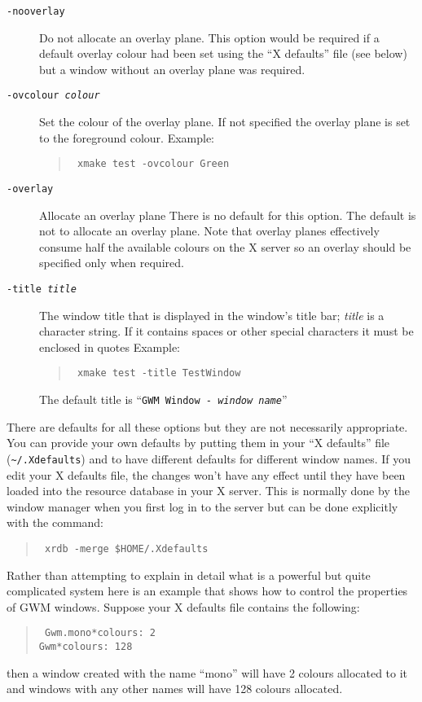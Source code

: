 \documentclass[twoside,11pt]{article}
\newcommand{\htmlref}[2]{#1}
\newcommand{\xlabel}[1]{}
\renewcommand{\_}{\texttt{\symbol{95}}}
\begin{document}
\begin{description}
\item[{\tt -nooverlay}] Do not allocate an overlay plane. This option
would be required if a default overlay colour had been set using the ``X
defaults'' file \htmlref{(see below)}{xdefaults} but a window without an
overlay plane was required.

\item[{\tt -ovcolour {\em colour}}]
Set the colour of the overlay plane. If not specified the overlay plane is set
to the foreground colour. Example:
\begin{quote}{\tt
xmake test -ovcolour Green}
\end{quote}

\item[{\tt -overlay}] Allocate an overlay plane
There is no default for this option. The default is not to
allocate an overlay plane. Note that overlay planes effectively consume half
the available colours on the X server so an overlay should be specified only
when required.

\item[{\tt -title {\em title}}] The window title that is displayed in the
window's title bar;
{\em title} is a character string. If it contains spaces or other
special characters it must be enclosed in quotes
Example:
\begin{quote}{\tt
xmake test -title Test\_Window}
\end{quote}
The default title is ``{\tt{GWM Window - }{\em window name}}''

\end{description}

\label{xdefaults}\xlabel{xdefaults}There are defaults
for all these options but they are not
necessarily appropriate. You can provide your own defaults by putting
them in your ``X defaults'' file ({\tt\~{}/.Xdefaults})
and to have different defaults for different window names. If you
edit your X defaults file, the changes won't have any effect until they
have been loaded into the resource database in your X server. This is normally
done by the window manager when you first log in to the server but can
be done explicitly with the command:
\begin{quote}{\tt
xrdb -merge \$HOME/.Xdefaults}
\end{quote}

Rather than attempting to explain in detail what is a powerful but quite
complicated system here is an example that shows how to control the properties
of GWM windows. Suppose your X defaults file contains the following:
\begin{quote}{\tt
Gwm.mono*colours: 2\\
Gwm*colours: 128}
\end{quote}
then a window created with the name ``mono'' will have 2 colours allocated to
it and windows with any other names will have 128 colours allocated.
\end{document}
